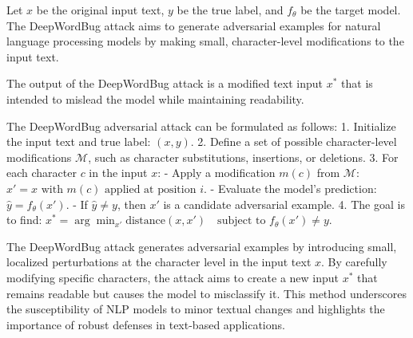 Let \( x \) be the original input text, \( y \) be the true label, and \( f_{\theta} \) be the target model. The DeepWordBug attack aims to generate adversarial examples for natural language processing models by making small, character-level modifications to the input text.

The output of the DeepWordBug attack is a modified text input \( x^* \) that is intended to mislead the model while maintaining readability.

The DeepWordBug adversarial attack can be formulated as follows:
1. Initialize the input text and true label:
   $
   (x, y).
   $
2. Define a set of possible character-level modifications \( \mathcal{M} \), such as character substitutions, insertions, or deletions.
3. For each character \( c \) in the input \( x \):
   - Apply a modification \( m(c) \) from \( \mathcal{M} \):
   $
   x' = x \text{ with } m(c) \text{ applied at position } i.
   $
   - Evaluate the model's prediction:
   $
   \hat{y} = f_{\theta}(x').
   $
   - If \( \hat{y} \neq y \), then \( x' \) is a candidate adversarial example.
4. The goal is to find:
   $
   x^* = \arg\min_{x'} \text{distance}(x, x') \quad \text{subject to } f_{\theta}(x') \neq y.
   $

The DeepWordBug attack generates adversarial examples by introducing small, localized perturbations at the character level in the input text \( x \). By carefully modifying specific characters, the attack aims to create a new input \( x^* \) that remains readable but causes the model to misclassify it. This method underscores the susceptibility of NLP models to minor textual changes and highlights the importance of robust defenses in text-based applications.
